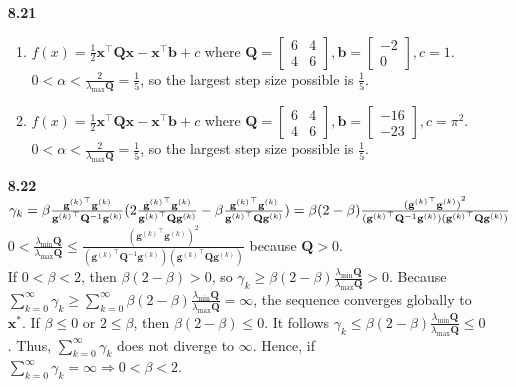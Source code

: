 \documentclass[10pt]{article}
\begin{document}
\begin{enumerate}
    \item [\textbf{8.21}] \begin{enumerate}
        \item $f(x)=\frac{1}{2}\mathbf{x}^\top\mathbf{Q}\mathbf{x}-\mathbf{x}^\top\mathbf{b}+c$ where $\mathbf{Q}=\begin{bmatrix}
            6 & 4\\
            4 & 6
        \end{bmatrix},\mathbf{b}=\begin{bmatrix}
            -2\\
            0
        \end{bmatrix},c=1$. $0<\alpha<\frac{2}{\lambda_{\max}\mathbf{Q}}=\frac{1}{5}$, so the largest step size possible is $\frac{1}{5}$.
        \item $f(x)=\frac{1}{2}\mathbf{x}^\top\mathbf{Q}\mathbf{x}-\mathbf{x}^\top\mathbf{b}+c$ where $\mathbf{Q}=\begin{bmatrix}
            6 & 4\\
            4 & 6
        \end{bmatrix},\mathbf{b}=\begin{bmatrix}
            -16\\
            -23
        \end{bmatrix},c=\pi^2$. $0<\alpha<\frac{2}{\lambda_{\max}\mathbf{Q}}=\frac{1}{5}$, so the largest step size possible is $\frac{1}{5}$.
    \end{enumerate}
   \item [\textbf{8.22}] $\gamma_k=\beta \frac{{\mathbf{g}^{(k)}}^\top\mathbf{g}^{(k)}}{{\mathbf{g}^{(k)}}^\top\mathbf{Q}^{-1}\mathbf{g}^{(k)}}(2\frac{{\mathbf{g}^{(k)}}^\top\mathbf{g}^{(k)}}{{\mathbf{g}^{(k)}}^\top\mathbf{Q}\mathbf{g}^{(k)}}-\beta\frac{{\mathbf{g}^{(k)}}^\top\mathbf{g}^{(k)}}{{\mathbf{g}^{(k)}}^\top\mathbf{Q}\mathbf{g}^{(k)}})\\
   =\beta(2-\beta)\frac{{({\mathbf{g}^{(k)}}^\top\mathbf{g}^{(k)})}^2}{({\mathbf{g}^{(k)}}^\top\mathbf{Q}^{-1}\mathbf{g}^{(k)})({\mathbf{g}^{(k)}}^\top\mathbf{Q}\mathbf{g}^{(k)})}$\\
   $0<\frac{\lambda_{\min}\mathbf{Q}}{\lambda_{\max}\mathbf{Q}}\le\frac{{({\mathbf{g}^{(k)}}^\top\mathbf{g}^{(k)})}^2}{({\mathbf{g}^{(k)}}^\top\mathbf{Q}^{-1}\mathbf{g}^{(k)})({\mathbf{g}^{(k)}}^\top\mathbf{Q}\mathbf{g}^{(k)})}$ because $\mathbf{Q}>0$.\\
   If $0<\beta<2$, then $\beta(2-\beta)>0$, so $\gamma_k\ge\beta(2-\beta)\frac{\lambda_{\min}\mathbf{Q}}{\lambda_{\max}\mathbf{Q}}>0$. Because $\displaystyle\sum_{k=0}^{\infty}\gamma_k\ge\sum_{k=0}^{\infty}\beta(2-\beta)\frac{\lambda_{\min}\mathbf{Q}}{\lambda_{\max}\mathbf{Q}}=\infty$, the sequence converges globally to $\mathbf{x}^*$.
   If $\beta\le 0$ or $2\le \beta$, then $\beta(2-\beta)\le0$. It follows $\gamma_k\le\beta(2-\beta)\frac{\lambda_{\min}\mathbf{Q}}{\lambda_{\max}\mathbf{Q}}\le0$. Thus, $\displaystyle\sum_{k=0}^{\infty}\gamma_k$ does not diverge to $\infty$.
   Hence, if $\displaystyle\sum_{k=0}^{\infty}\gamma_k=\infty\Rightarrow 0<\beta<2$.
\end{enumerate}
\end{document}
